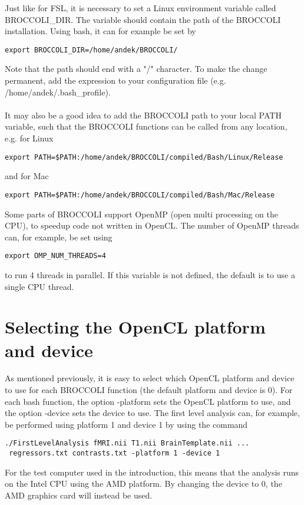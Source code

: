 Just like for FSL, it is necessary to set a Linux environment variable called BROCCOLI\_DIR. The variable should contain the path of the BROCCOLI installation. Using bash, it can for example be set by

\begin{verbatim}
export BROCCOLI_DIR=/home/andek/BROCCOLI/
\end{verbatim}
Note that the path should end with a "/" character. To make the change permanent, add the expression to your configuration file (e.g. /home/andek/.bash\_profile). \\ \\ It may also be a good idea to add the BROCCOLI path to your local PATH variable, such that the BROCCOLI functions can be called from any location, e.g. for Linux

\begin{verbatim}
export PATH=$PATH:/home/andek/BROCCOLI/compiled/Bash/Linux/Release
\end{verbatim}
and for Mac

\begin{verbatim}
export PATH=$PATH:/home/andek/BROCCOLI/compiled/Bash/Mac/Release
\end{verbatim}
Some parts of BROCCOLI support OpenMP (open multi processing on the CPU), to speedup code not written in OpenCL. The number of OpenMP threads can, for example, be set using

\begin{verbatim}
export OMP_NUM_THREADS=4
\end{verbatim}
to run 4 threads in parallel. If this variable is not defined, the default is to use a single CPU thread.

\section{Selecting the OpenCL platform and device}

As mentioned previously, it is easy to select which OpenCL platform and device to use for each BROCCOLI function (the default platform and device is 0). For each bash function, the option -platform sets the OpenCL platform to use, and the option -device sets the device to use. The first level analysis can, for example, be performed using platform 1 and device 1 by using the command

\begin{verbatim}
./FirstLevelAnalysis fMRI.nii T1.nii BrainTemplate.nii ...
 regressors.txt contrasts.txt -platform 1 -device 1
\end{verbatim}
For the test computer used in the introduction, this means that the analysis runs on the Intel CPU using the AMD platform. By changing the device to 0, the AMD graphics card will instead be used. 


